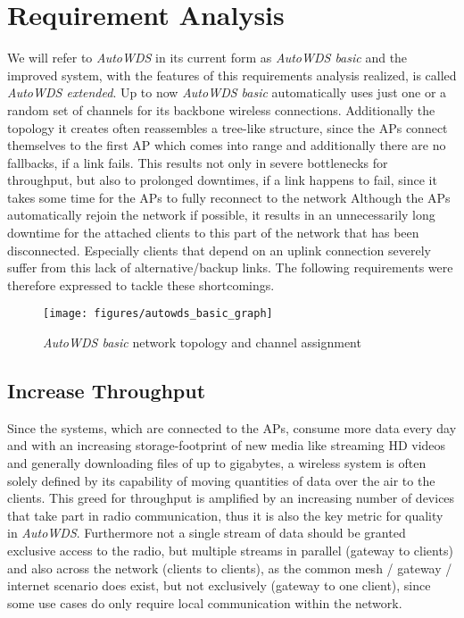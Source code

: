 \chapter{Requirement Analysis}
  \label{reqana}
  We will refer to \textit{AutoWDS} in its current form as \textit{AutoWDS basic} and the improved system, with the features of this requirements analysis realized, 
  is called \textit{AutoWDS extended}.
  Up to now \textit{AutoWDS basic} automatically uses just one or a random set of channels for its backbone wireless connections. 
  Additionally the topology it creates often reassembles a tree-like structure, since the APs connect themselves 
  to the first \ac{AP} which comes into range and additionally there are no fallbacks, if a link fails. 
  This results not only in severe bottlenecks for throughput, but also to prolonged downtimes, if a link happens to fail, since
  it takes some time for the APs to fully reconnect to the network Although the APs automatically rejoin the network if possible, 
  it results in an unnecessarily long downtime for the attached clients to this part of the network that has been disconnected. 
  Especially clients that depend on an uplink connection severely suffer from this lack of alternative/backup links. 
  The following requirements were therefore expressed to tackle these shortcomings.
  
  \begin{figure}[h!]
    \centering
    \texttt{[image: figures/autowds\_basic\_graph]}
    \caption{\textit{AutoWDS basic} network topology and channel assignment}
    \label{fig:autowds_basic_graph}
  \end{figure}

  \section{Increase Throughput}
  \label{reqincreasethroughput}
  Since the systems, which are connected to the APs, consume more data every day and with an increasing storage-footprint of new media like streaming \ac{HD} videos
  and generally downloading files of up to gigabytes, a wireless system is often solely defined by its capability of moving quantities of data over the air to the clients.
  This greed for throughput is amplified by an increasing number of devices that take part in radio communication, 
  thus it is also the key metric for quality in \textit{AutoWDS}. 
  Furthermore not a single stream of data should be granted exclusive access to the radio, but
  multiple streams in parallel (gateway to clients) and also across the network (clients to clients), 
  as the common mesh / gateway / internet scenario does exist, but not exclusively (gateway to one client),
  since some use cases do only require local communication within the network.
  
